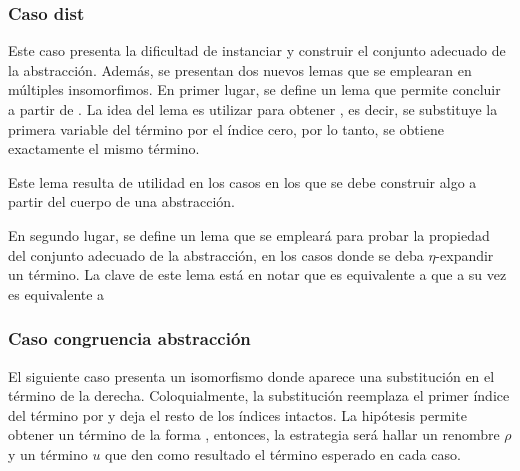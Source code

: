 \subsubsection{Caso dist}

Este caso presenta la dificultad de instanciar y construir el conjunto adecuado de la abstracción.
Además, se presentan dos nuevos lemas que se emplearan en múltiples insomorfimos.
En primer lugar, se define un lema que permite concluir \snstar{} a partir de \snstar {} .
La idea del lema es utilizar  para obtener
, es decir, se substituye la primera variable del término por el índice cero, por lo tanto, se obtiene exactamente el mismo término.



Este lema resulta de utilidad en los casos en los que se debe construir algo a partir del cuerpo de una abstracción.


En segundo lugar, se define un lema que se empleará para probar la propiedad del conjunto adecuado de la abstracción, en los casos donde se deba $\eta$-expandir un término.
La clave de este lema está en notar que 
es equivalente a  que a su vez es equivalente a  \bound{$\rho$} 



\subsubsection{Caso congruencia abstracción}

El siguiente caso presenta un isomorfismo donde aparece una substitución en el término de la derecha.
Coloquialmente, la substitución  reemplaza el primer índice del término por
\const{[}  \const{]≡} 
y deja el resto de los índices intactos.
La hipótesis  permite obtener un término de la forma
\snstar
{}
, entonces, la estrategia será hallar un renombre $\rho$ y un término $u$ que den como resultado el término esperado en cada caso.

